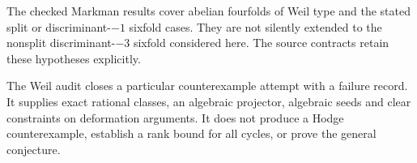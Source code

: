 The checked Markman results cover abelian fourfolds of Weil type and the stated split or discriminant-$-1$ sixfold cases. They are not silently extended to the nonsplit discriminant-$-3$ sixfold considered here. The source contracts retain these hypotheses explicitly.

The Weil audit closes a particular counterexample attempt with a failure record. It supplies exact rational classes, an algebraic projector, algebraic seeds and clear constraints on deformation arguments. It does not produce a Hodge counterexample, establish a rank bound for all cycles, or prove the general conjecture.

